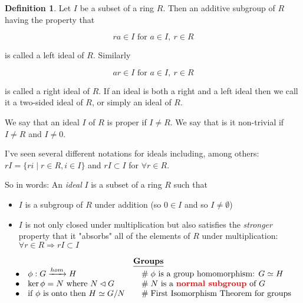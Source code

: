 \documentclass{article}
\theoremstyle{definition}
\newtheorem{definition}{Definition}[section]
\begin{document}
\begin{definition}
Let $I$ be a subset of a ring $R$. Then an additive subgroup of $R$ having the property that

\begin{equation*}
ra \in I \text{ for }  a \in I, \: r \in R
\end{equation*}

\bigskip
\noindent
is called a left ideal of $R$.  Similarly

\begin{equation*}
ar \in I \text{ for }  a \in I, \: r \in R
\end{equation*}

\bigskip
\noindent
is called a right ideal of $R$. If an ideal is both a right and a left ideal then we call it a two-sided ideal of $R$, or simply an ideal of $R$.
\end{definition}

\noindent
 We say that an ideal $I$ of $R$ is proper if $I \neq R$.  We say that is it non-trivial if $I \neq R$ and  $I \neq  0$.

\bigskip
\noindent
I've seen several different notations for ideals including, among others:  $rI = \{ri \mid r \in R, i \in I\}$ and 
$rI \subset I$ for $\forall r \in R$. 

\bigskip
\noindent
So in words: An \emph{ideal} $I$ is a subset of a ring $R$ such that

\begin{itemize}
\item $I$ is a subgroup of $R$ under addition (so $0 \in I$ and so $I \neq \emptyset$) 
\item $I$  is not only closed under multiplication but also satisfies the \emph{stronger} property that it  
"absorbs" all of the elements of $R$ under multiplication: $\forall r \in R \Rightarrow rI \subset I$
\end{itemize}

\bigskip
\bigskip
\begin{mybox}
\begin{equation*}
\begin{array}{lllll}
&& \underline{\mathbf{Groups}} \\ 
\bullet&  \phi: G \xrightarrow{hom} H                            &\quad  \mathrel{\#} \text{$\phi$ is a group homomorphism: $G \simeq H$}   \\
\bullet&  \ker \phi = N$ where $N \lhd G                       &\quad  \mathrel{\#} \text{$N$ is a \textbf{{\color{red} normal subgroup}} of $G$}  \\
\bullet&  \text{if $\phi$ is onto then $H \simeq G/N$}   &\quad \mathrel{\#} \text{First Isomorphism Theorem for groups} \\
\end{array}
\end{equation*}
\end{mybox}
\end{document}
